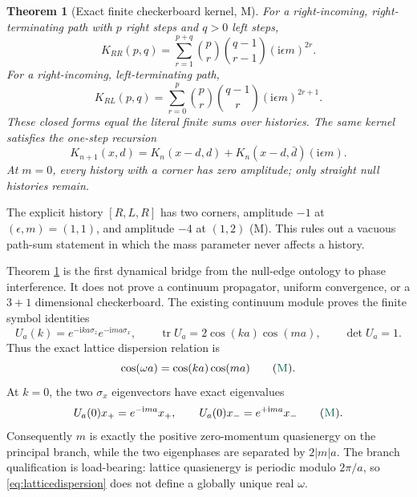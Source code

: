 \documentclass[11pt]{article}
\newcommand{\Mtag}{\textcolor{verified}{\textsc{M}}}
\newcommand{\ii}{\mathrm{i}}
\newcommand{\tr}{\operatorname{tr}}
\newtheorem{theorem}{Theorem}[section]
\begin{document}
\begin{theorem}[Exact finite checkerboard kernel, \Mtag]\label{thm:checker}
For a right-incoming, right-terminating path with $p$ right steps and $q>0$
left steps,
\begin{equation}\label{eq:rrkernel}
 K_{RR}(p,q)=\sum_{r=1}^{p+q}
 \binom{p}{r}\binom{q-1}{r-1}(\ii\epsilon m)^{2r}.
\end{equation}
For a right-incoming, left-terminating path,
\begin{equation}\label{eq:rlkernel}
 K_{RL}(p,q)=\sum_{r=0}^{p}
 \binom{p}{r}\binom{q-1}{r}(\ii\epsilon m)^{2r+1}.
\end{equation}
These closed forms equal the literal finite sums over histories.  The same
kernel satisfies the one-step recursion
\begin{equation}\label{eq:diracrec}
 K_{n+1}(x,d)=K_n(x-d,d)+K_n(x-d,\bar d)(\ii\epsilon m).
\end{equation}
At $m=0$, every history with a corner has zero amplitude; only straight null
histories remain.
\end{theorem}

The explicit history $[R,L,R]$ has two corners, amplitude $-1$ at
$(\epsilon,m)=(1,1)$, and amplitude $-4$ at $(1,2)$ (\Mtag).  This rules out a
vacuous path-sum statement in which the mass parameter never affects a
history.

Theorem \ref{thm:checker} is the first dynamical bridge from the null-edge
ontology to phase interference.  It does not prove a continuum propagator,
uniform convergence, or a $3+1$ dimensional checkerboard.  The existing
continuum module proves the finite symbol identities
\begin{equation}\label{eq:walksymbol}
 U_a(k)=e^{-\ii ka\sigma_z}e^{-\ii ma\sigma_x},
 \qquad \tr U_a=2\cos(ka)\cos(ma),
 \qquad \det U_a=1.
\end{equation}
Thus the exact lattice dispersion relation is
\begin{equation}\label{eq:latticedispersion}
 \cos(\omega a)=\cos(ka)\cos(ma)
 \qquad(\Mtag).
\end{equation}
At $k=0$, the two $\sigma_x$ eigenvectors have exact eigenvalues
\begin{equation}\label{eq:zeromomentumgap}
 U_a(0)x_+=e^{-\ii ma}x_+,
 \qquad
 U_a(0)x_-=e^{+\ii ma}x_-
 \qquad(\Mtag).
\end{equation}
Consequently $m$ is exactly the positive zero-momentum quasienergy on the
principal branch, while the two eigenphases are separated by $2|m|a$.  The
branch qualification is load-bearing: lattice quasienergy is periodic modulo
$2\pi/a$, so \eqref{eq:latticedispersion} does not define a globally unique
real $\omega$.
\end{document}
